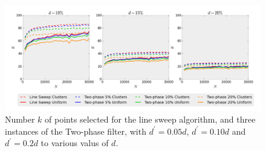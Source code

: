 \begin{figure}[!h] 
	\centering
	\includegraphics[width=\linewidth]{Pictures/ls_bp_k} 
	\caption[Number $k$ of points selected for Line Sweep and Two-phase filter algorithms.]{Number $k$ of points selected for the line sweep algorithm, and three instances of the Two-phase filter, with $d^\prime=0.05d$, $d^\prime=0.10d$ and $d^\prime=0.2d$ to various valus of $d$.}
	\label{fig:ls_bp_k} 
\end{figure}